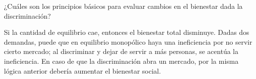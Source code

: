 \question ¿Cuáles son los principios básicos para evaluar cambios en el bienestar dada la discriminación?
\begin{solution}
Si la cantidad de equilibrio cae, entonces el bienestar total disminuye. Dadas dos demandas, puede que en equilibrio monopólico haya una ineficiencia por no servir cierto mercado; al discriminar y dejar de servir a más personas, se acentúa la ineficiencia. En caso de que la discriminación abra un mercado, por la misma lógica anterior debería aumentar el bienestar social.

\end{solution}

